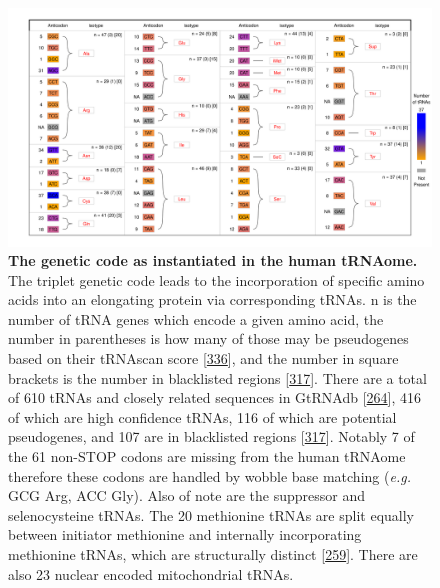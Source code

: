 \documentclass[
]{book}
\begin{document}
\begin{figure}

{\centering \includegraphics[width=1\linewidth]{figs/kutteresq_BLcount} 

}

\caption{\textbf{The genetic code as instantiated in the human tRNAome.} The triplet genetic code leads to the incorporation of specific amino acids into an elongating protein via corresponding tRNAs. n is the number of tRNA genes which encode a given amino acid, the number in parentheses is how many of those may be pseudogenes based on their tRNAscan score {[}\protect\hyperlink{ref-Lowe2016}{336}{]}, and the number in square brackets is the number in blacklisted regions {[}\protect\hyperlink{ref-Amemiya2019}{317}{]}. There are a total of 610 tRNAs and closely related sequences in GtRNAdb {[}\protect\hyperlink{ref-Chan2009}{264}{]}, 416 of which are high confidence tRNAs, 116 of which are potential pseudogenes, and 107 are in blacklisted regions {[}\protect\hyperlink{ref-Amemiya2019}{317}{]}. Notably 7 of the 61 non-STOP codons are missing from the human tRNAome therefore these codons are handled by wobble base matching (\emph{e.g.} GCG Arg, ACC Gly). Also of note are the suppressor and selenocysteine tRNAs. The 20 methionine tRNAs are split equally between initiator methionine and internally incorporating methionine tRNAs, which are structurally distinct {[}\protect\hyperlink{ref-Kolitz2010}{259}{]}. There are also 23 nuclear encoded mitochondrial tRNAs.}\label{fig:kutteresq}
\end{figure}
\end{document}
